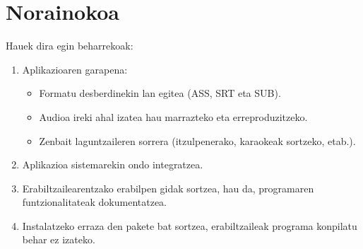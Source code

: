 \section{Norainokoa}
Hauek dira egin beharrekoak:
\begin{enumerate}
\item Aplikazioaren garapena:
	\begin{itemize}
	\item Formatu desberdinekin lan egitea (ASS, SRT eta SUB).
	\item Audioa ireki ahal izatea hau marrazteko eta erreproduzitzeko.
	\item Zenbait laguntzaileren sorrera (itzulpenerako, karaokeak sortzeko, etab.).
	\end{itemize}
\item Aplikazioa sistemarekin ondo integratzea.
\item Erabiltzailearentzako erabilpen gidak sortzea, hau da, programaren funtzionalitateak dokumentatzea.
\item Instalatzeko erraza den pakete bat sortzea, erabiltzaileak programa konpilatu behar ez izateko.
\end{enumerate}

